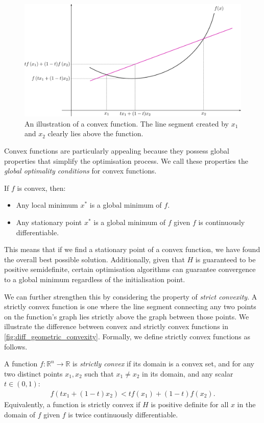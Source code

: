 \begin{figure}[h]
    \centering
    \includegraphics[width=0.7\linewidth]{figures/2background/convex_function.svg.png}
    \caption{An illustration of a convex function. The line segment created by $x_1$ and $x_2$ clearly lies above the function.}
    \label{fig:convex_function}
\end{figure}
Convex functions are particularly appealing because they possess global properties that simplify the optimisation process. We call these properties the \textit{global optimality conditions} for convex functions.
\begin{definition}
    If $f$ is convex, then: 
    \begin{itemize}
        \item Any local minimum $x^*$ is a global minimum of $f$.
        \item Any stationary point $x^*$ is a global minimum of $f$ given $f$ is continuously differentiable.
    \end{itemize}
\end{definition}

This means that if we find a stationary point of a convex function, we have found the overall best possible solution. Additionally, given that $H$ is guaranteed to be positive semidefinite, certain optimisation algorithms can guarantee convergence to a global minimum regardless of the initialisation point. 

We can further strengthen this by considering the property of \textit{strict convexity}. A strictly convex function is one where the line segment connecting any two points on the function's graph lies strictly above the graph between those points. We illustrate the difference between convex and strictly convex functions in \cref{fig:diff_geometric_convexity}. Formally, we define strictly convex functions as follows.
\begin{definition}
    A function $f: \mathbb{R}^n \to \mathbb{R}$ is \textit{strictly convex} if its domain is a convex set, and for any two distinct points $x_1, x_2$ such that $x_1 \neq x_2$ in its domain, and any scalar $t \in (0, 1)$:
    \begin{align}
        f(t x_1 + (1-t)x_2) < t f(x_1) + (1-t)f(x_2).
    \end{align}
    Equivalently, a function is strictly convex if $H$ is positive definite for all $x$ in the domain of $f$ given $f$ is twice continuously differentiable.
\end{definition}

